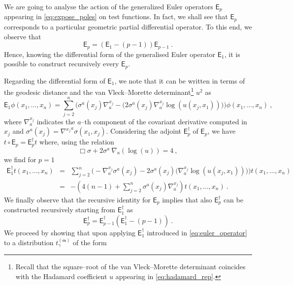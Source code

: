 \documentclass[12pt]{book}
\newcommand{\Esf}{\mathsf{E}}
\theoremstyle{break}
\begin{document}
We are going to analyse the action of the generalized Euler operators $\Esf_p$ appearing in \eqref{eq:expose_poles} on test functions. In fact, we shall see that $\Esf_p$ corresponds to a particular geometric partial differential operator. To this end, we observe that
%
\begin{equation*}
\Esf_p = (\Esf_1 - (p-1)) \Esf_{p-1} \ . 
\end{equation*}
%
Hence, knowing the differential form of the generalised Euler operator $\Esf_1$, it is possible to construct recursively every $\Esf_p$.


Regarding the differential form of $\Esf_1$, we note that it can be written in terms of the geodesic distance and the van Vleck--Morette determinant\footnote{Recall that the square--root of the van Vleck--Morette determinant coincides with the Hadamard coefficient $u$ appearing in \eqref{eq:hadamard_rep}.} $u^2$  as
%
\begin{equation*}
\Esf_1 \phi(x_1 , \dots , x_n) = \sum_{j=2}^n \Bigg( \sigma^a(x_j) \nabla^{x_j}_a  - \bigg(2  \sigma^a(x_j) \nabla^{x_j}_a  \log\left(u(x_j,x_1)\right) \bigg) \Bigg) \phi(x_1 , \dots , x_n) \ , 
\end{equation*}
%
where $\nabla^{x_j}_a$ indicates the $a$--th component of the covariant derivative computed in $x_j$ and $\sigma^a(x_j) = {\nabla^{x_j}}^a \sigma(x_1,x_j)$. Considering the adjoint $\Esf^\dagger_p$ of $\Esf_p$, we have $t \circ \Esf_p = \Esf^\dagger_p t$ where, using the relation
\begin{equation*}
\Box \sigma + 2 \sigma^a \ \nabla_a\left( \log (u) \right) = 4 \ , 
\end{equation*}
%
we find for $p=1$
%
\begin{eqnarray}
\Esf_1^\dagger  t(x_1,\dots,x_n) &=& \sum_{j=2}^n \Bigg( - \nabla^{x_j}_a \sigma^a(x_j) - 2 \sigma^a(x_j) \bigg( \nabla^{x_j}_a \log\left(u(x_j,x_1)\right) \bigg) \Bigg) t(x_1,\dots,x_n) \nonumber \\
&=& -\left( 4(n-1) + \sum_{j=2}^n \sigma^a(x_j) \nabla^{x_j}_a \right) t(x_1,\dots,x_n) \ .
\label{eq:euler_operator}
\end{eqnarray}
%
We finally observe that the recursive identity for $\Esf_p$ implies that also $\Esf^\dagger_p$ can be constructed recursively starting from $\Esf^\dagger_1$ as 
%
\begin{equation*}
\Esf_p^\dagger = \Esf_{p-1}^\dagger \left(\Esf_1^\dagger-(p-1)\right) \ . 
\end{equation*}
%
We proceed by showing that upon applying $\Esf^\dagger_1$ introduced in \eqref{eq:euler_operator} to a distribution $t_\gamma^{(\boldsymbol{\alpha})}$ of the form
\end{document}
